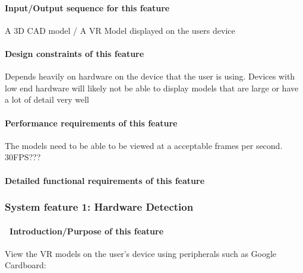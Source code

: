 \documentclass[letterpaper, 10pt, draftclsnofoot, onecolumn]{IEEEtran}
\begin{document}
{\paragraph[Input/Output sequence for this
feature]{\rmfamily\bfseries\color{black}
Input/Output sequence for this feature}
{\color{black}
A 3D CAD model / A VR Model displayed on the users device  }

\paragraph[Design constraints of this
feature]{\rmfamily\bfseries\color{black} Design
constraints of this feature}
{\color{black}
Depends heavily on hardware on the device that the user is using. Devices with low end hardware will likely not be able to display models that are large or have a lot of detail very well  }

\paragraph[Performance requirements of this
feature]{\rmfamily\bfseries\color{black}
Performance requirements of this feature}
{\color{black}
The models need to be able to be viewed at a acceptable frames per second. 30FPS???  }

\paragraph[Detailed functional requirements of this
feature]{\rmfamily\bfseries\color{black}
Detailed functional requirements of this feature}


\subsubsection[{Updated Vrok-it}]{\rmfamily\bfseries\color{black} System
feature 1: Hardware Detection}
\paragraph[\ Introduction/Purpose of this
feature]{\foreignlanguage{english}{\ }\foreignlanguage{english}{Introduction/Purpose
of this feature}}
{\color{black}
View the VR models on the user's device using peripherals such as Google Cardboard:   }

}
\end{document}

